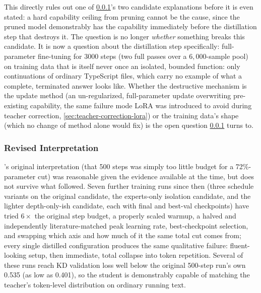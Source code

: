 \documentclass{article}
\theoremstyle{plain}
\theoremstyle{definition}
\theoremstyle{remark}
\begin{document}
This directly rules out one of \cref{sec:phase4-revised-interpretation}'s
two candidate explanations before it is even stated: a hard capability
ceiling from pruning cannot be the cause, since the pruned model
demonstrably has the capability immediately before the distillation step
that destroys it. The question is no longer \emph{whether} something
breaks this candidate. It is now a question about the distillation
step specifically: full-parameter fine-tuning for 3000 steps (two full
passes over a $6{,}000$-sample pool) on training data that is itself
never once an isolated, bounded function: only continuations of
ordinary TypeScript files, which carry no example of what a complete,
terminated answer looks like. Whether the destructive mechanism is the
update method (an un-regularized, full-parameter update overwriting
pre-existing capability, the same failure mode LoRA was introduced to
avoid during teacher correction, \cref{sec:teacher-correction-lora}) or
the training data's shape (which no change of method alone would fix)
is the open question \cref{sec:phase4-revised-interpretation} turns to.

\subsubsection{Revised Interpretation}
\label{sec:phase4-revised-interpretation}

's original interpretation (that 500 steps
was simply too little budget for a 72\%-parameter cut) was reasonable
given the evidence available at the time, but does not survive what
followed. Seven further training runs since then (three schedule
variants on the original candidate, the experts-only isolation
candidate, and the lighter depth-only-ish candidate, each with final and
best-val checkpoints) have tried $6\times$ the original step budget, a
properly scaled warmup, a halved and independently literature-matched
peak learning rate, best-checkpoint selection, and swapping which axis
and how much of it the same total cut comes from; every single
distilled configuration produces the same qualitative failure:
fluent-looking setup, then immediate, total collapse into token
repetition. Several of these runs reach KD validation loss well below
the original 500-step run's own 0.535 (as low as 0.401), so the student
is demonstrably capable of matching the teacher's token-level
distribution on ordinary running text.
\end{document}
